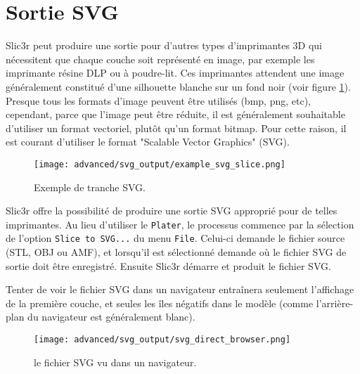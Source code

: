 
\section{Sortie SVG} %
\label{sec:svg_output}

Slic3r peut produire une sortie pour d'autres types d'imprimantes 3D qui n\'ecessitent que chaque couche soit repr\'esent\'e en image, par exemple les imprimante r\'esine DLP ou \`a poudre-lit. Ces imprimantes attendent une image g\'en\'eralement constitu\'e d'une silhouette blanche sur un fond noir (voir figure \ref{fig:example_svg_slice}).  Presque tous les formats d'image peuvent \^etre utilis\'es (bmp, png, etc), cependant, parce que l'image peut \^etre r\'eduite, il est g\'en\'eralement souhaitable d'utiliser un format vectoriel, plut\^ot qu'un format bitmap. Pour cette raison, il est courant d'utiliser le format "Scalable Vector Graphics" (SVG).

\begin{figure}[H]
\centering
\texttt{[image: advanced/svg\_output/example\_svg\_slice.png]}
\caption{Exemple de tranche SVG.}
\label{fig:example_svg_slice}
\end{figure}


Slic3r offre la possibilit\'e de produire une sortie SVG appropri\'e pour de telles imprimantes.  Au lieu d'utiliser le \texttt{Plater}, le processus commence par la s\'election de l'option \texttt{Slice to SVG...} du menu \texttt{File}.  Celui-ci demande le fichier source (STL, OBJ ou AMF), et lorsqu'il est s\'electionn\'e demande o\`u le fichier SVG de sortie doit \^etre enregistr\'e. Ensuite Slic3r d\'emarre et produit le fichier SVG.

Tenter de voir le fichier SVG dans un navigateur entra\^inera seulement l'affichage de la premi\`ere couche, et seules les \^iles n\'egatifs dans le mod\`ele (comme l'arri\`ere-plan du navigateur est g\'en\'eralement blanc).

\begin{figure}[H]
\centering
\texttt{[image: advanced/svg\_output/svg\_direct\_browser.png]}
\caption{le fichier SVG vu dans un navigateur.}
\label{fig:svg_direct_browser}
\end{figure}

